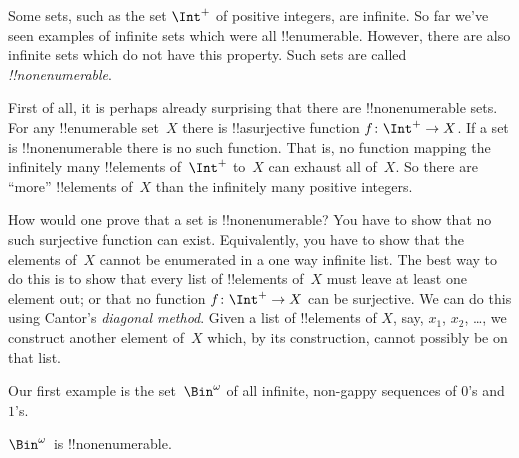 \documentclass[../../../include/open-logic-section]{subfiles}
\begin{document}


Some sets, such as the set $\Int^+$ of positive integers, are
infinite. So far we've seen examples of infinite sets which were all
!!{enumerable}. However, there are also infinite sets which do not
have this property. Such sets are called \emph{!!{nonenumerable}}.

First of all, it is perhaps already surprising that there are
!!{nonenumerable} sets.  For any !!{enumerable} set~$X$ there is
!!a{surjective} function $f \colon \Int^+ \to X$.  If a set is
!!{nonenumerable} there is no such function.  That is, no function
mapping the infinitely many !!{element}s of~$\Int^+$ to~$X$ can
exhaust all of~$X$.  So there are ``more'' !!{element}s of~$X$ than
the infinitely many positive integers.

How would one prove that a set is !!{nonenumerable}? You have to show
that no such surjective function can exist. Equivalently, you have to
show that the elements of~$X$ cannot be enumerated in a one way
infinite list.  The best way to do this is to show that every list of
!!{element}s of~$X$ must leave at least one element out; or that no
function $f\colon \Int^+ \to X$ can be surjective.  We can do this
using Cantor's \emph{diagonal method}.  Given a list of !!{element}s
of $X$, say, $x_1$, $x_2$, \dots, we construct another element of~$X$
which, by its construction, cannot possibly be on that list.

Our first example is the set~$\Bin^\omega$ of all infinite, non-gappy
sequences of $0$'s and $1$'s.

\begin{thm}
$\Bin^\omega$~is !!{nonenumerable}.
\end{thm}
\end{document}
